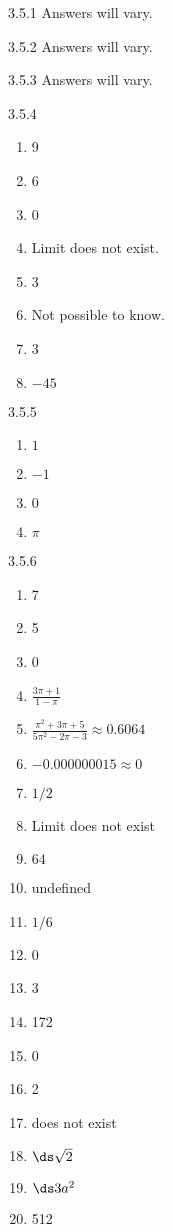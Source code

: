 \begin{Answer}{3.5.1}
{Answers will vary.
}
\end{Answer}
\begin{Answer}{3.5.2}
{Answers will vary.
}
\end{Answer}
\begin{Answer}{3.5.3}
{Answers will vary.
}
\end{Answer}
\begin{Answer}{3.5.4}
\begin{enumerate}
\item
{9}
\item
{6}
\item
{0}
\item
{Limit does not exist.}
\item
{3}
\item
{Not possible to know.}
\item
{3}
\item
{$-45$}
\end{enumerate}
\end{Answer}
\begin{Answer}{3.5.5}
\begin{enumerate}
\item {$1$}
\item {$-1$}
\item {$0$}
\item {$\pi$}
\end{enumerate}
\end{Answer}
\begin{Answer}{3.5.6}
\begin{multicols}{2}
\begin{enumerate}
	\item	7
	\item	5
	\item	0
	\item {$\frac{3\pi+1}{1-\pi}$}
	\item {$\frac{\pi^2+3\pi+5}{5\pi^2-2\pi-3} \approx 0.6064$}
	\item 	{$-0.000000015\approx 0$}
	\item {$1/2$}
	\item 	{Limit does not exist}
	\item 	{$64$}
	\item	undefined
	\item	$1/6$
	\item	0
	\item	3
	\item	172
	\item	0
	\item	2
	\item	does not exist
	\item	$\ds \sqrt2$
	\item	$\ds 3a^2$
	\item	512
\end{enumerate}
\end{multicols}
\end{Answer}
